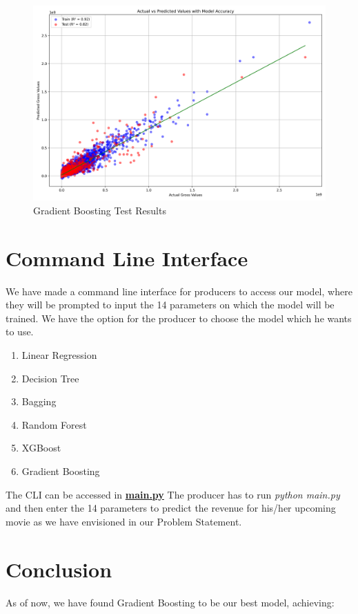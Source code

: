 \documentclass[conference]{IEEEtran}
\begin{document}
    \begin{figure}[h]
        \centering
        \includegraphics[width=1\linewidth]{model_accuracy_plot.png}
        \caption{Gradient Boosting Test Results}
        \label{fig:gradient_boosting_test}
    \end{figure}

\section{Command Line Interface}
    We have made a command line interface for producers to access our model, where they will be prompted to input the 14 parameters on which the model will be trained.
    We have the option for the producer to choose the model which he wants to use.
    \begin{enumerate}
        \item Linear Regression
        \item Decision Tree
        \item Bagging
        \item Random Forest
        \item XGBoost
        \item Gradient Boosting
    \end{enumerate}

    The CLI can be accessed in \href{https://github.com/Vikranth3140/Movie-Revenue-Prediction/blob/main/main.py}{\textbf{main.py}}
    The producer has to run \textit{python main.py} and then enter the 14 parameters to predict the revenue for his/her upcoming movie as we have envisioned in our Problem Statement.

\section{Conclusion}
    As of now, we have found Gradient Boosting to be our best model, achieving:
    
\end{document}
